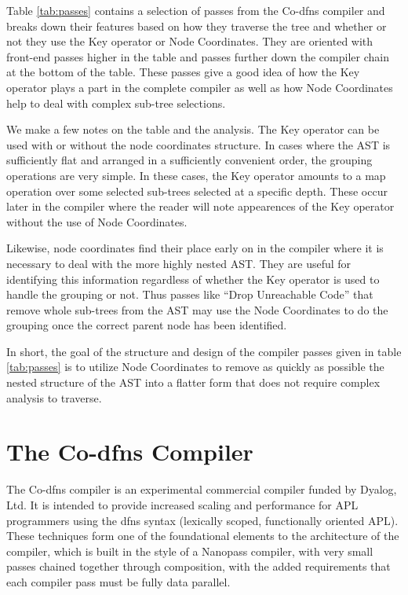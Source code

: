 \documentclass[numbers,preprint]{sigplanconf}
\begin{document}
Table \ref{tab:passes} contains a selection of passes from the
Co-dfns compiler and breaks down their features based on how they
traverse the tree and whether or not they use the Key operator or
Node Coordinates. They are oriented with front-end passes higher in
the table and passes further down the compiler chain at the bottom
of the table. These passes give a good idea of how the Key operator
plays a part in the complete compiler as well as how Node Coordinates
help to deal with complex sub-tree selections.

We make a few notes on the table and the analysis. The Key operator
can be used with or without the node coordinates structure. In cases
where the AST is sufficiently flat and arranged in a sufficiently
convenient order, the grouping operations are very simple. In these
cases, the Key operator amounts to a map operation over some selected
sub-trees selected at a specific depth. These occur later in the
compiler where the reader will note appearences of the Key operator
without the use of Node Coordinates.

Likewise, node coordinates find their place early on in the compiler
where it is necessary to deal with the more highly nested AST. They
are useful for identifying this information regardless of whether the
Key operator is used to handle the grouping or not. Thus passes like
``Drop Unreachable Code'' that remove whole sub-trees from the AST
may use the Node Coordinates to do the grouping once the correct
parent node has been identified.

In short, the goal of the structure and design of the compiler passes
given in table \ref{tab:passes} is to utilize Node Coordinates to
remove as quickly as possible the nested structure of the AST into
a flatter form that does not require complex analysis to traverse.

\section{The Co-dfns Compiler}

The Co-dfns compiler is an experimental commercial compiler funded by 
Dyalog, Ltd. It is intended to provide increased scaling and performance
for APL programmers using the dfns syntax (lexically scoped, functionally 
oriented APL). These techniques form one of the foundational elements to 
the architecture of the compiler, which is built in the style of a Nanopass 
compiler, with very small passes chained together through composition, with 
the added requirements that each compiler pass must be fully data parallel. 
\end{document}
